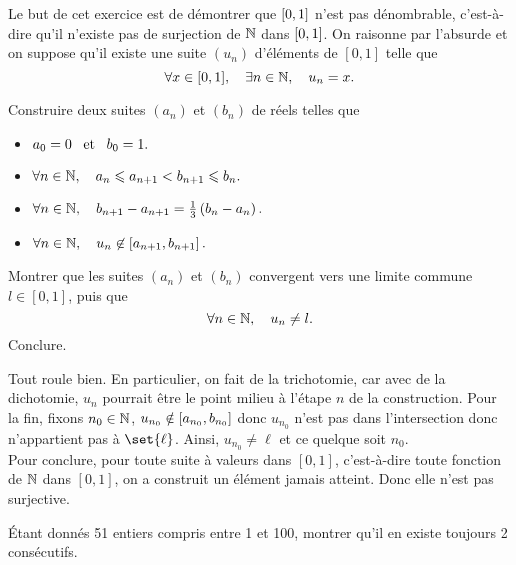 \documentclass{magnolia}
\begin{document}

Le but de cet exercice est de démontrer que $\left[0,1\right]$ n'est pas dénombrable,
c'est-à-dire qu'il n'existe pas de surjection de $\mathbb{N}$ dans $\left[0,1\right]$. On raisonne
par l'absurde et on suppose qu'il existe une suite $(u_n)$ d'éléments de $[0,1]$ telle que
\[\forall x\in[0,1],\quad \exists n\in\mathbb{N},\quad u_n=x.\]
\begin{questions}
\question Construire deux suites $(a_n)$ et $(b_n)$ de réels telles que
  \begin{itemize}
  \item $a_0= 0 \quad\!\text{et}\quad\! b_0=1.$
  \item $\forall n\in\mathbb{N} ,\quad a_n\leqslant a_{n+1}< b_{n+1}\leqslant b_n.$
  \item $\forall n\in\mathbb{N} ,\quad b_{n+1}-a_{n+1}=\frac{1}{3}\left(b_n-a_n\right).$
  \item $\forall n\in\mathbb{N} ,\quad u_n \not\in \left[a_{n+1},b_{n+1}\right].$
  \end{itemize}
\question Montrer que les suites $(a_n)$ et $(b_n)$ convergent vers une limite commune 
  $l\in[0,1]$, puis que
  \[\forall n\in\mathbb{N} ,\quad u_n\neq l.\]
  Conclure.
\end{questions}


\begin{sol}
Tout roule bien. En particulier, on fait de la trichotomie, car avec de la dichotomie, $u_n$ pourrait être le point milieu à l'étape $n$ de la construction. Pour la fin, fixons $n_0\in \mathbb{N}$, $u_{n_0}\notin \left[a_{n_0},b_{n_0}\right]$ donc $u_{n_0}$ n'est pas dans l'intersection donc n'appartient pas à $\set{\ell}$. Ainsi, $u_{n_0}\neq \ell$ et ce quelque soit $n_0$.\\

Pour conclure, pour toute suite à valeurs dans $[0,1]$, c'est-à-dire toute fonction de $\mathbb{N}$ dans $[0,1]$, on a construit un élément jamais atteint. Donc elle n'est pas surjective.
\end{sol}


Étant donnés 51 entiers compris entre 1 et 100, montrer qu'il en existe toujours 2 consécutifs.
\end{document}

